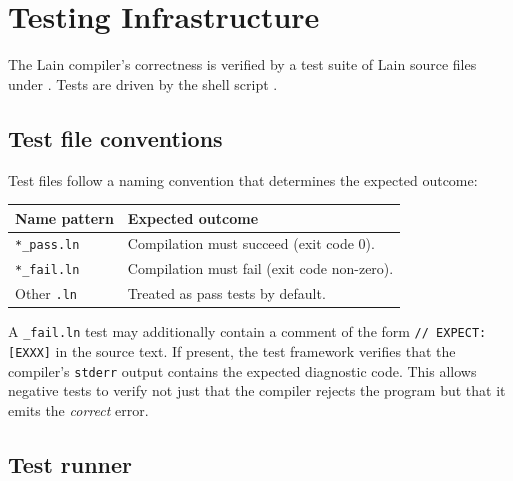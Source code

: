 \chapter{Testing Infrastructure}
\label{chap:21-testing}

\pnum
The Lain compiler's correctness is verified by a test suite of Lain source files
under .  Tests are driven by the shell script
.

\section{Test file conventions}
\label{sec:test-conventions}

\pnum
Test files follow a naming convention that determines the expected outcome:

\begin{center}
\begin{tabular}{ll}
\toprule
\textbf{Name pattern} & \textbf{Expected outcome} \\
\midrule
\texttt{*\_pass.ln} & Compilation must succeed (exit code 0). \\
\texttt{*\_fail.ln} & Compilation must fail (exit code non-zero). \\
Other \texttt{.ln}  & Treated as pass tests by default. \\
\bottomrule
\end{tabular}
\end{center}

\pnum
A \texttt{\_fail.ln} test may additionally contain a comment of the form
\texttt{// EXPECT: [EXXX]} in the source text.  If present, the test framework
verifies that the compiler's \texttt{stderr} output contains the expected
diagnostic code.  This allows negative tests to verify not just that the
compiler rejects the program but that it emits the \emph{correct} error.

\section{Test runner}
\label{sec:test-runner}

